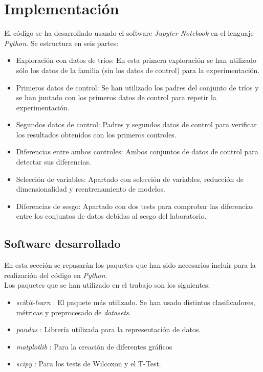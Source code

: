 
\chapter{Implementación}
El código se ha desarrollado usando el software \textit{Jupyter Notebook} en el lenguaje \textit{Python}. Se estructura en seis partes:
\begin{itemize}
  \item Exploración con datos de tríos: En esta primera exploración se han utilizado sólo los datos de la familia (sin los datos de control) para la experimentación.
  \item Primeros datos de control: Se han utilizado los padres del conjunto de tríos y se han juntado con los primeros datos de control para repetir la experimentación.
  \item Segundos datos de control: Padres y segundos datos de control para verificar los resultados obtenidos con los primeros controles.
  \item Diferencias entre ambos controles: Ambos conjuntos de datos de control para detectar sus diferencias.
  \item Selección de variables: Apartado con selección de variables, reducción de dimensionalidad y reentrenamiento de modelos.
  \item Diferencias de sesgo: Apartado con dos tests para comprobar las diferencias entre los conjuntos de datos debidas al sesgo del laboratorio.
\end{itemize}
\section{Software desarrollado}
En esta sección se repasarán los paquetes que han sido necesarios incluir para la realización del código en \textit{Python}.\\
Los paquetes que se han utilizado en el trabajo son los siguientes:
\begin{itemize}
\itemsep 0em 
  \item \textit{scikit-learn} \cite{scikit-learn}: El paquete más utilizado. Se han usado distintos clasificadores, métricas y preprocesado de \textit{datasets}.
  \item \textit{pandas} \cite{mckinney-proc-scipy-2010}: Librería utilizada para la representación de datos.
  \item \textit{matplotlib} \cite{Hunter:2007}: Para la creación de diferentes gráficos
  \item \textit{scipy} \cite{scipy}: Para los tests de Wilcoxon y el T-Test.
\end{itemize}

